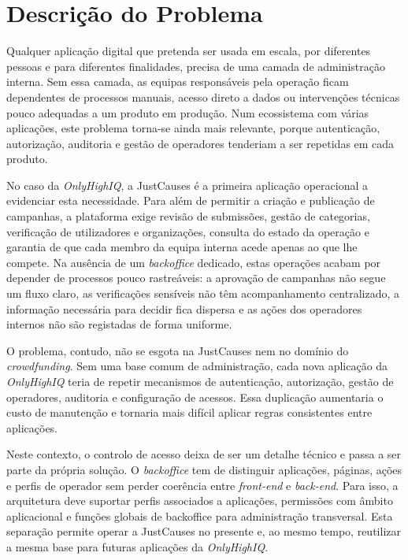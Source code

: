\section{Descrição do Problema}
\label{sec:problema}

Qualquer aplicação digital que pretenda ser usada em escala, por diferentes pessoas e para diferentes finalidades, precisa de uma camada de administração interna. Sem essa camada, as equipas responsáveis pela operação ficam dependentes de processos manuais, acesso direto a dados ou intervenções técnicas pouco adequadas a um produto em produção. Num ecossistema com várias aplicações, este problema torna-se ainda mais relevante, porque autenticação, autorização, auditoria e gestão de operadores tenderiam a ser repetidas em cada produto.

No caso da \textit{OnlyHighIQ}, a JustCauses é a primeira aplicação operacional a evidenciar esta necessidade. Para além de permitir a criação e publicação de campanhas, a plataforma exige revisão de submissões, gestão de categorias, verificação de utilizadores e organizações, consulta do estado da operação e garantia de que cada membro da equipa interna acede apenas ao que lhe compete. Na ausência de um \textit{backoffice} dedicado, estas operações acabam por depender de processos pouco rastreáveis: a aprovação de campanhas não segue um fluxo claro, as verificações sensíveis não têm acompanhamento centralizado, a informação necessária para decidir fica dispersa e as ações dos operadores internos não são registadas de forma uniforme.

O problema, contudo, não se esgota na JustCauses nem no domínio do \textit{crowdfunding}. Sem uma base comum de administração, cada nova aplicação da \textit{OnlyHighIQ} teria de repetir mecanismos de autenticação, autorização, gestão de operadores, auditoria e configuração de acessos. Essa duplicação aumentaria o custo de manutenção e tornaria mais difícil aplicar regras consistentes entre aplicações.

Neste contexto, o controlo de acesso deixa de ser um detalhe técnico e passa a ser parte da própria solução. O \textit{backoffice} tem de distinguir aplicações, páginas, ações e perfis de operador sem perder coerência entre \textit{front-end} e \textit{back-end}. Para isso, a arquitetura deve suportar perfis associados a aplicações, permissões com âmbito aplicacional e funções globais de backoffice para administração transversal. Esta separação permite operar a JustCauses no presente e, ao mesmo tempo, reutilizar a mesma base para futuras aplicações da \textit{OnlyHighIQ}.


